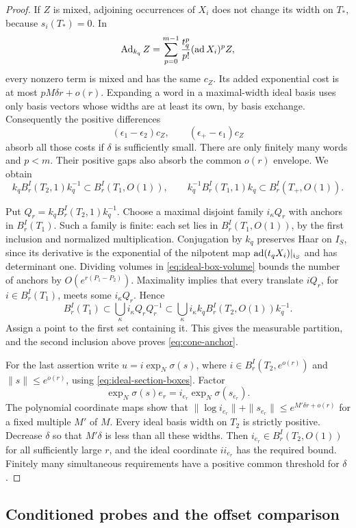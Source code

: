 \begin{proof}
If $Z$ is mixed, adjoining occurrences of $X_i$ does not change its width
on $T_*$, because $s_i(T_*)=0$.  In
\[
 \operatorname{Ad}_{k_q}Z
  =\sum_{p=0}^{m-1}\frac{t_q^p}{p!}(\operatorname{ad} X_i)^p Z,
\]
every nonzero term is mixed and has the same $c_Z$.  Its added exponential
cost is at most $pM\delta r+o(r)$.  Expanding a word in a maximal-width
ideal basis uses only basis vectors whose widths are at least its own,
by basis exchange.  Consequently the positive differences
\[
 (\epsilon_1-\epsilon_2)c_Z,
 \qquad (\epsilon_+-\epsilon_1)c_Z
\]
absorb all those costs if $\delta$ is sufficiently small.  There are only
finitely many words and $p<m$.  Their positive gaps also absorb the common
$o(r)$ envelope.  We obtain
\[
 k_qB^I_r(T_2,1)k_q^{-1}\subset B^I_r(T_1,O(1)),
 \qquad
 k_q^{-1}B^I_r(T_1,1)k_q\subset B^I_r(T_+,O(1)).
\]

Put $Q_r=k_qB^I_r(T_2,1)k_q^{-1}$.  Choose a maximal disjoint family
$i_\kappa Q_r$ with anchors in $B^I_r(T_1)$.  Such a family is finite: each set
lies in $B^I_r(T_1,O(1))$, by the first inclusion and normalized
multiplication.  Conjugation by $k_q$ preserves Haar on $I_S$, since its
derivative is the exponential of the nilpotent map
$\operatorname{ad}(t_qX_i)|_{\mathfrak i_S}$ and has determinant one.
Dividing volumes in \eqref{eq:ideal-box-volume} bounds the number of
anchors by $O(e^{r(P_1-P_2)})$.  Maximality implies that every translate
$iQ_r$, for $i\in B^I_r(T_1)$, meets some $i_\kappa Q_r$.  Hence
\[
 B^I_r(T_1)\subset\bigcup_\kappa i_\kappa Q_rQ_r^{-1}
  \subset\bigcup_\kappa i_\kappa k_qB^I_r(T_2,O(1))k_q^{-1}.
\]
Assign a point to the first set containing it.  This gives the measurable
partition, and the second inclusion above proves \eqref{eq:cone-anchor}.

For the last assertion write $u=i\exp_N\sigma(s)$, where
$i\in B^I_r(T_2,e^{o(r)})$ and $\|s\|\le e^{o(r)}$, using
\eqref{eq:ideal-section-boxes}.  Factor
\[
 \exp_N\sigma(s)e_r=i_{e_r}\exp_N\sigma(s_{e_r}).
\]
The polynomial coordinate maps show that
$\|\log i_{e_r}\|+\|s_{e_r}\|\le e^{M'\delta r+o(r)}$ for a fixed multiple
$M'$ of $M$.  Every ideal basis width on $T_2$ is strictly positive.
Decrease $\delta$ so that $M'\delta$ is less than all these widths.
Then $i_{e_r}\in B^I_r(T_2,O(1))$ for all sufficiently large $r$, and the ideal
coordinate $ii_{e_r}$ has the required bound.  Finitely many simultaneous
requirements have a positive common threshold for $\delta$.
\end{proof}

\subsection{Conditioned probes and the offset comparison}

